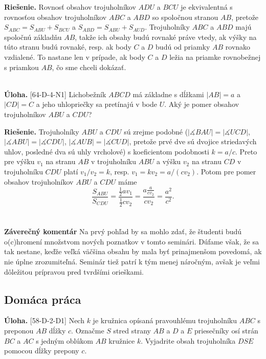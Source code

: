 \documentclass[11pt,a4paper,oneside,final]{book}
\newcommand{\ul}{\textbf{Úloha.} }
\newcommand{\rie}{\textbf{Riešenie.} }
\newcommand{\ma}{\measuredangle}
\begin{document}
\rie Rovnosť obsahov trojuholníkov $ADU$ a $BCU$ je ekvivalentná s rovnosťou obsahov trojuholníkov $ABC$ a $ABD$ so spoločnou stranou $AB$, pretože $S_{ABC}=S_{ABU}+S_{BCU}$ a $S_{ABD}=S_{ABU}+S_{AUD}$. Trojuholníky $ABC$ a $ABD$ majú spoločnú základňu $AB$, takže ich obsahy budú rovnaké práve vtedy, ak výšky na túto stranu budú rovnaké, resp. ak body $C$ a $D$ budú od priamky $AB$ rovnako vzdialené. To nastane len v prípade, ak body $C$ a $D$ ležia na priamke rovnobežnej s priamkou $AB$, čo sme chceli dokázať.\\
\\
\begin{tcolorbox}[breakable,notitle,boxrule=0pt,colback=light-gray,colframe=light-gray]\ul [64-D-4-N1] Lichobežník $ABCD$ má základne s dĺžkami $|AB|=a$ a $|CD|=C$ a jeho uhlopriečky sa pretínajú v bode $U$. Aký je pomer obsahov trojuholníkov $ABU$ a $CDU$?

\end{tcolorbox}

\rie Trojuholníky $ABU$ a $CDU$ sú zrejme podobné ($|\ma BAU|=|\ma UCD|$, $|\ma ABU|=|\ma CDU|$, $|\ma AUB|=|\ma CUD|$, pretože prvé dve sú dvojice striedavých uhlov, posledné dva sú uhly vrcholové) s koeficientom podobnosti $k=a/c$. Preto pre výšku $v_1$ na stranu $AB$ v trojuholníku $ABU$ a výšku $v_2$ na stranu $CD$ v trojuholníku $CDU$ platí $v_1/v_2=k$, resp. $v_1=kv_2=a/(cv_2)$. Potom pre pomer obsahov trojuholníkov $ABU$ a $CDU$ máme
$$\frac{S_{ABU}}{S_{CDU}}=\frac{\frac{1}{2}av_1}{\frac{1}{2}cv_2}=\frac{a\frac{a}{cv_2}}{cv_2}=\frac{a^2}{c^2}.$$\\
\\
\textbf{Záverečný komentár} Na prvý pohľad by sa mohlo zdať, že študenti budú o(c)hromení množstvom nových poznatkov v tomto seminári. Dúfame však, že sa tak nestane, keďže veľká väčšina obsahu by mala byť prinajmenšom povedomá, ak nie úplne zrozumiteľná. Seminár tiež patrí k tým menej náročným, avšak je veľmi dôležitou prípravou pred tvrdšími orieškami.

\subsection*{Domáca práca}
\begin{tcolorbox}[breakable,notitle,boxrule=0pt,colback=light-gray,colframe=light-gray]\ul [58-D-2-D1] Nech $k$ je kružnica opísaná pravouhlému trojuholníku $ABC$ s preponou $AB$ dĺžky $c$. Označme $S$ stred strany $AB$ a $D$ a $E$ priesečníky osí strán $BC$ a $AC$ s jedným oblúkom $AB$ kružnice $k$. Vyjadrite obsah trojuholníka $DSE$ pomocou dĺžky prepony $c$.

\end{tcolorbox}
\end{document}
